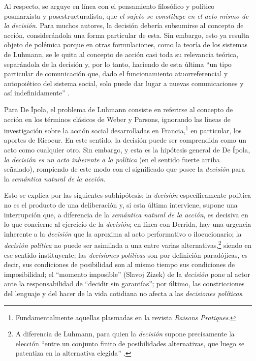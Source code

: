 {Al respecto, se arguye en línea con el pensamiento filosófico y político posmarxista y posestructuralista, que \emph{el sujeto se constituye en el acto mismo de la} \emph{decisión}. Para muchos autores, la decisión debería subsumirse al concepto de acción, considerándola una forma particular de esta. Sin embargo, esto ya resulta objeto de polémica porque en otras formulaciones, como la teoría de los sistemas de Luhmann, se le quita al concepto de acción casi toda su relevancia teórica, separándola de la decisión y, por lo tanto, haciendo de esta última \enquote{un tipo particular de comunicación que, dado el funcionamiento atuorreferencial y autopoiético del sistema social, solo puede dar lugar a nuevas comunicaciones y así indefinidamente} \parencite[71]{1600-DEIPOLA2001}.

Para De Ípola, el problema de Luhmann consiste en referirse al concepto de acción en los términos clásicos de Weber y Parsons, ignorando las líneas de investigación sobre la acción social desarrolladas en Francia,\footnote{Fundamentalmente aquellas plasmadas en la revista \emph{Raisons Pratiques}.} en particular, los aportes de Ricoeur. En este sentido, la decisión puede ser comprendida como un acto como cualquier otro. Sin embargo, y esta es la hipótesis general de De Ípola, \emph{la decisión es un acto inherente a la política} (en el sentido fuerte arriba señalado), rompiendo de este modo con el significado que posee la \emph{decisión} para la \emph{semántica natural de la acción}.

Esto se explica por las siguientes subhipótesis: la \emph{decisión} específicamente política no es el producto de una deliberación y, si esta última interviene, supone una interrupción que, a diferencia de la \emph{semántica natural de la acción}, es decisiva en lo que concierne al ejercicio de la \emph{decisión}; en línea con Derrida, hay una urgencia inherente a la \emph{decisión} que la aproxima al acto performativo o ilocucionario; la \emph{decisión política} no puede ser asimilada a una entre varias alternativas,\footnote{A diferencia de Luhmann, para quien la \emph{decisión} supone precisamente la elección \enquote{entre un conjunto finito de posibilidades alternativas, que luego se patentiza en la alternativa elegida} \parencite[71]{1600-DEIPOLA2001}.} siendo en ese sentido instituyente; las \emph{decisiones políticas} son por definición paradójicas, es decir, sus condiciones de posibilidad son al mismo tiempo sus condiciones de imposibilidad; el \enquote{momento imposible} (Slavoj Zizek) de la \emph{decisión} pone al actor ante la responsabilidad de \enquote{decidir sin garantías}; por último, las constricciones del lenguaje y del hacer de la vida cotidiana  no afecta a las \emph{decisiones políticas}.

}
